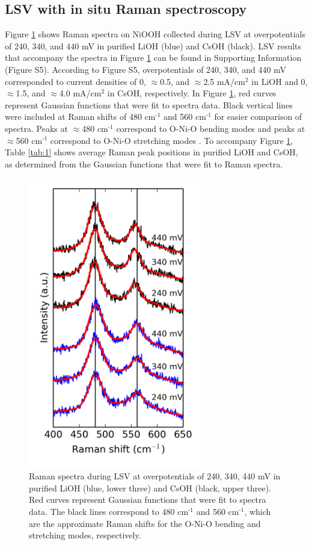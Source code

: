 \documentclass[journal=jpccck,manuscript=article,email=true]{achemso}
\begin{document}
\subsection{LSV with in situ Raman spectroscopy}
\label{sec-3-2}
Figure \ref{fig-3} shows Raman spectra on NiOOH collected during LSV at overpotentials of 240, 340, and 440 mV in purified LiOH (blue) and CsOH (black). LSV results that accompany the spectra in Figure \ref{fig-3} can be found in Supporting Information (Figure S5). According to Figure S5, overpotentials of 240, 340, and 440 mV corresponded to current densities of 0, $\approx$0.5, and $\approx$2.5 mA/cm$^{\text{2}}$ in LiOH and 0, $\approx$1.5, and $\approx$4.0 mA/cm$^{\text{2}}$ in CsOH, respectively. In Figure \ref{fig-3}, red curves represent Gaussian functions that were fit to spectra data. Black vertical lines were included at Raman shifts of 480 cm$^{\text{-1}}$ and 560 cm$^{\text{-1}}$ for easier comparison of spectra. Peaks at $\approx$480 cm$^{\text{-1}}$ correspond to O-Ni-O bending modes and peaks at $\approx$560 cm$^{\text{-1}}$ correspond to O-Ni-O stretching modes \cite{desilvestro-1988-charac-redox}. To accompany Figure \ref{fig-3}, Table \ref{tab:1} shows average Raman peak positions in purified LiOH and CsOH, as determined from the Gaussian functions that were fit to Raman spectra.

\begin{figure}[h]
\centering
\includegraphics[width=3in]{./images/figures-main/raman-combined-pure-10-31-14.png}
\caption{\label{fig-3}Raman spectra during LSV at overpotentials of 240, 340, 440 mV in purified LiOH (blue, lower three) and CsOH (black, upper three). Red curves represent Gaussian functions that were fit to spectra data. The black lines correspond to 480 cm$^{\text{-1}}$ and 560 cm$^{\text{-1}}$, which are the approximate Raman shifts for the O-Ni-O bending and stretching modes, respectively.}
\end{figure}
\end{document}
